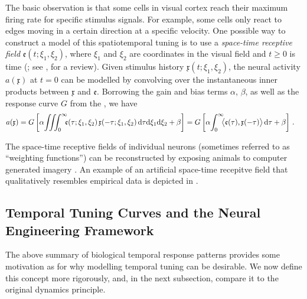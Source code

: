 The basic observation is that some cells in visual cortex reach their maximum firing rate for specific stimulus signals.
For example, some cells only react to edges moving in a certain direction at a specific velocity.
One possible way to construct a model of this spatiotemporal tuning is to use a \emph{space-time receptive field} $\mathfrak{e}(t; \xi_1, \xi_2)$, where $\xi_1$ and $\xi_2$ are coordinates in the visual field and $t \geq 0$ is time (\cite{watson1983look,adelson1985spatiotemporal}; see \cite{carandini1999linearity}, for a review).
Given stimulus history $\mathfrak{x}(t; \xi_1, \xi_2)$, the neural activity $a(\mathfrak{x})$ at $t = 0$ can be modelled by convolving over the instantaneous inner products between $\mathfrak{x}$ and $\mathfrak{e}$.
Borrowing the gain and bias terms $\alpha$, $\beta$, as well as the response curve $G$ from the \NEF, we have
\begin{align}
	a(\mathfrak{x})
		&= G\left[\alpha \! \iiint_0^\infty \!\!\! \mathfrak{e}(\tau; \xi_1, \xi_2) \, \mathfrak{x}(-\tau; \xi_1, \xi_2) \,
		\D \tau \D \xi_1 \D \xi_2 + \beta \right]
		 = G\left[\alpha \! \int_0^\infty \!\!\! \big\langle \mathfrak{e}(\tau), \mathfrak{x}(-\tau) \big\rangle \,
		\D \tau + \beta \right] \, .
	\label{eqn:tuning_curve_from_temporal_receptive_field}
\end{align}

The space-time receptive fields of individual neurons (sometimes referred to as \enquote{weighting functions}) can be reconstructed by exposing animals to computer generated imagery \citep{mclean1989contribution}.
An example of an artificial space-time recepitve field that qualitatively resembles empirical data \citep[cf.][]{deangelis1993spatiotemporal} is depicted in .

\subsection{Temporal Tuning Curves and the Neural Engineering Framework}
\label{sec:temporal_tuning_nef}

The above summary of biological temporal response patterns provides some motivation as for why modelling temporal tuning can be desirable.
We now define this concept more rigorously, and, in the next subsection, compare it to the original \NEF dynamics principle.


